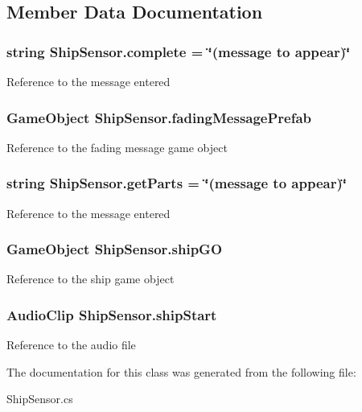 \subsection{Member Data Documentation}
\hypertarget{class_ship_sensor_a8834195ac644b5dc64c7a9d6a6edc4d6}{
\subsubsection[{complete}]{\setlength{\rightskip}{0pt plus 5cm}string Ship\-Sensor.\-complete = \char`\"{}(message to appear)\char`\"{}}}\label{class_ship_sensor_a8834195ac644b5dc64c7a9d6a6edc4d6}
Reference to the message entered \hypertarget{class_ship_sensor_a082be7c2cb3d2ba4505d43028ffc72d3}{
\subsubsection[{fading\-Message\-Prefab}]{\setlength{\rightskip}{0pt plus 5cm}Game\-Object Ship\-Sensor.\-fading\-Message\-Prefab}}\label{class_ship_sensor_a082be7c2cb3d2ba4505d43028ffc72d3}
Reference to the fading message game object \hypertarget{class_ship_sensor_a12336194b71d77cc4d3512fac5817ff7}{
\subsubsection[{get\-Parts}]{\setlength{\rightskip}{0pt plus 5cm}string Ship\-Sensor.\-get\-Parts = \char`\"{}(message to appear)\char`\"{}}}\label{class_ship_sensor_a12336194b71d77cc4d3512fac5817ff7}
Reference to the message entered \hypertarget{class_ship_sensor_ab6f6fac60964f90237b62bfb62b8b494}{
\subsubsection[{ship\-G\-O}]{\setlength{\rightskip}{0pt plus 5cm}Game\-Object Ship\-Sensor.\-ship\-G\-O}}\label{class_ship_sensor_ab6f6fac60964f90237b62bfb62b8b494}
Reference to the ship game object \hypertarget{class_ship_sensor_aef9b7a32bf81f3b3f234692315a18f12}{
\subsubsection[{ship\-Start}]{\setlength{\rightskip}{0pt plus 5cm}Audio\-Clip Ship\-Sensor.\-ship\-Start}}\label{class_ship_sensor_aef9b7a32bf81f3b3f234692315a18f12}
Reference to the audio file 

The documentation for this class was generated from the following file\-:\begin{DoxyCompactItemize}
\item 
Ship\-Sensor.\-cs\end{DoxyCompactItemize}
